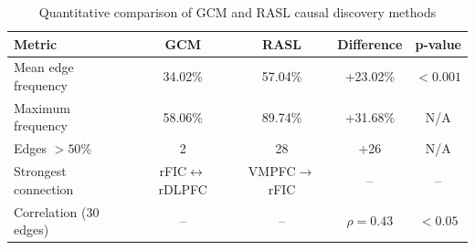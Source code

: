 \begin{table}[htbp]
\centering
\caption{Quantitative comparison of GCM and RASL causal discovery methods}
\label{tab:comparison}
\begin{tabular}{lcccc}
\hline
Metric & GCM & RASL & Difference & p-value \\
\hline
Mean edge frequency & 34.02\% & 57.04\% & +23.02\% & $<0.001$ \\
Maximum frequency & 58.06\% & 89.74\% & +31.68\% & N/A \\
Edges $>50\%$ & 2 & 28 & +26 & N/A \\
Strongest connection & rFIC$\leftrightarrow$rDLPFC & VMPFC$\rightarrow$rFIC & -- & -- \\
Correlation (30 edges) & -- & -- & $\rho=0.43$ & $<0.05$ \\
\hline
\end{tabular}
\end{table}


